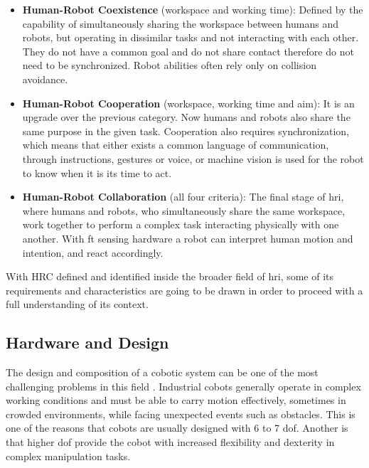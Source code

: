 \begin{itemize}
    \item \textbf{Human-Robot Coexistence} (workspace and working time): Defined by the capability of simultaneously sharing the workspace between humans and robots, but operating in dissimilar tasks and not interacting with each other. They do not have a common goal and do not share contact therefore do not need to be synchronized. Robot abilities often rely only on collision avoidance.
    \item \textbf{Human-Robot Cooperation} (workspace, working time and aim): It is an upgrade over the previous category. Now humans and robots also share the same purpose in the given task. Cooperation also requires synchronization, which means that either exists a common language of communication, through instructions, gestures or voice, or machine vision is used for the robot to know when it is its time to act.
    \item \textbf{Human-Robot Collaboration} (all four criteria): The final stage of \ac{hri}, where humans and robots, who simultaneously share the same workspace, work together to perform a complex task interacting physically with one another. With \ac{ft} sensing hardware a robot can interpret human motion and intention, and react accordingly. 
\end{itemize}


\par With HRC defined and identified inside the broader field of \ac{hri}, some of its requirements and characteristics are going to be drawn in order to proceed with a full understanding of its context.


\subsection{Hardware and Design}

\par The design and composition of a cobotic system can be one of the most challenging problems in this field \cite{handbook, cobot.design}. Industrial cobots generally operate in complex working conditions and must be able to carry motion effectively, sometimes in crowded environments, while facing unexpected events such as obstacles. This is one of the reasons that cobots are usually designed with 6 to 7 \ac{dof}. Another is that higher \ac{dof} provide the cobot with increased flexibility and dexterity in complex manipulation tasks.

